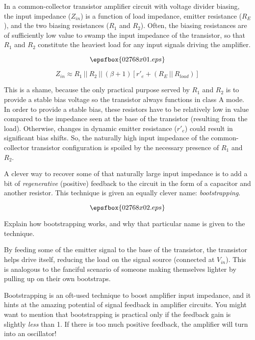 

In a common-collector transistor amplifier circuit with voltage divider biasing, the input impedance ($Z_{in}$) is a function of load impedance, emitter resistance ($R_E$), and the two biasing resistances ($R_1$ and $R_2$).  Often, the biasing resistances are of sufficiently low value to swamp the input impedance of the transistor, so that $R_1$ and $R_2$ constitute the heaviest load for any input signals driving the amplifier.

$$\epsfbox{02768x01.eps}$$

$$Z_{in} \approx R_1 \> || \> R_2 \> || \> (\beta + 1)[r'_e + (R_E \> || \> R_{load})]$$

This is a shame, because the only practical purpose served by $R_1$ and $R_2$ is to provide a stable bias voltage so the transistor always functions in class A mode.  In order to provide a stable bias, these resistors have to be relatively low in value compared to the impedance seen at the base of the transistor (resulting from the load).  Otherwise, changes in dynamic emitter resistance ($r'_e$) could result in significant bias shifts.  So, the naturally high input impedance of the common-collector transistor configuration is spoiled by the necessary presence of $R_1$ and $R_2$.

A clever way to recover some of that naturally large input impedance is to add a bit of {\it regenerative} (positive) feedback to the circuit in the form of a capacitor and another resistor.  This technique is given an equally clever name: {\it bootstrapping}.

$$\epsfbox{02768x02.eps}$$

Explain how bootstrapping works, and why that particular name is given to the technique.







By feeding some of the emitter signal to the base of the transistor, the transistor helps drive itself, reducing the load on the signal source (connected at $V_{in}$).  This is analogous to the fanciful scenario of someone making themselves lighter by pulling up on their own bootstraps.







Bootstrapping is an oft-used technique to boost amplifier input impedance, and it hints at the amazing potential of signal feedback in amplifier circuits.  You might want to mention that bootstrapping is practical only if the feedback gain is slightly {\it less} than 1.  If there is too much positive feedback, the amplifier will turn into an oscillator!




